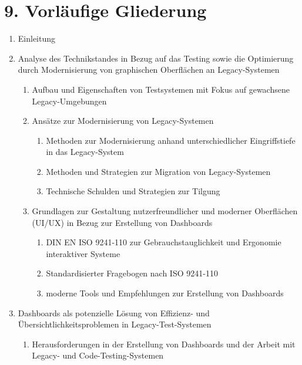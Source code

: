 \section*{9. Vorläufige Gliederung}


\begin{enumerate}
    \item Einleitung
    \item Analyse des Technikstandes in Bezug auf das Testing sowie die Optimierung durch Modernisierung von graphischen Oberflächen an Lega\-cy-Systemen
    \begin{enumerate}
        \item Aufbau und Eigenschaften von Testsystemen mit Fokus auf gewachsene Legacy-Umgebungen
        \item Ansätze zur Modernisierung von Legacy-Systemen
        \begin{enumerate}
            \item Methoden zur Modernisierung anhand unterschiedlicher Eingriffstiefe in das Legacy-System
            \item Methoden und Strategien zur Migration von Legacy-Systemen
            \item Technische Schulden und Strategien zur Tilgung
        \end{enumerate}
        \item Grundlagen zur Gestaltung nutzerfreundlicher und moderner Oberflächen (UI/UX) in Bezug zur Erstellung von Dashboards
        \begin{enumerate}
            \item DIN EN ISO 9241-110 zur Gebrauchstauglichkeit und Ergonomie interaktiver Systeme
            \item Standardisierter Fragebogen nach ISO 9241-110
            \item moderne Tools und Empfehlungen zur Erstellung von Dashboards
        \end{enumerate}
    \end{enumerate}
    \item Dashboards als potenzielle Lösung von Effizienz- und Übersichtlichkeitsproblemen in Legacy-Test-Systemen
    \begin{enumerate}
        \item Herausforderungen in der Erstellung von Dashboards und der Arbeit mit Legacy- und Code-Testing-Systemen

\end{enumerate}
\end{enumerate}
